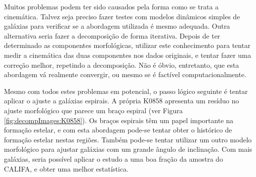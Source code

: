 Muitos problemas podem ter sido causados pela forma como se trata a cinemática.
Talvez seja preciso fazer testes com modelos dinâmicos simples de galáxias para
verificar se a abordagem utilizada é mesmo adequada. Outra alternativa seria
fazer a decomposição de forma iterativa. Depois de ter determinado as
componentes morfológicas, utilizar este conhecimento para tentar medir a
cinemática das duas componentes nos dados originais, e tentar fazer uma
correção melhor, repetindo a decomposição. Não é óbvio, entretanto, que esta
abordagem vá realmente convergir, ou mesmo se é factível computacionalmente.

Mesmo com todos estes problemas em potencial, o passo lógico seguinte é tentar
aplicar o ajuste a galáxias espirais. A própria K0858 apresenta um resíduo no
ajuste morfológico que parece um braço espiral (ver Figura
\ref{fig:decompImages:K0858}). Os braços espirais têm um papel importante na
formação estelar, e com esta abordagem pode-se tentar obter o histórico de
formação estelar nestas regiões. Também pode-se tentar utilizar um outro modelo
morfológico para ajustar galáxias com um grande ângulo de inclinação. Com mais
galáxias, seria possível aplicar o estudo a uma boa fração da amostra do CALIFA,
e obter uma melhor estatística.

